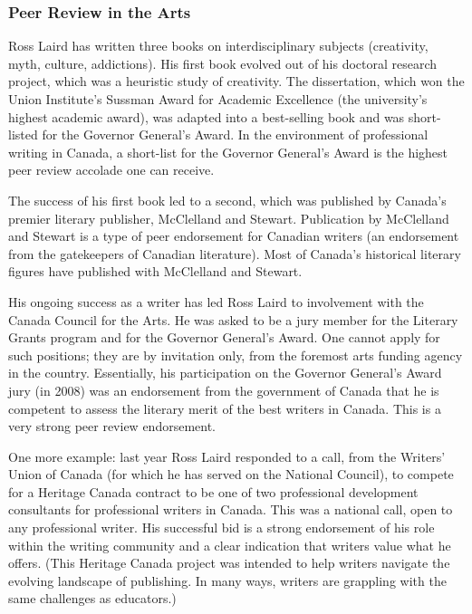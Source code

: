 \documentclass[letterpaper,10pt,headsepline]{scrreprt}
\begin{document}
\subsubsection{Peer Review in the Arts}

Ross Laird has written three books on interdisciplinary subjects (creativity,
myth, culture, addictions). His first book evolved out of his doctoral
research project, which was a heuristic study of creativity. The dissertation,
which won the Union Institute's Sussman Award for Academic Excellence (the
university's highest academic award), was adapted into a best-selling book and
was short-listed for the Governor General's Award. In the environment of
professional writing in Canada, a short-list for the Governor General's Award
is the highest peer review accolade one can receive.

The success of his first book led to a second, which was published by Canada's
premier literary publisher, McClelland and Stewart. Publication by McClelland
and Stewart is a type of peer endorsement for Canadian writers (an endorsement
from the gatekeepers of Canadian literature). Most of Canada's historical
literary figures have published with McClelland and Stewart.

His ongoing success as a writer has led Ross Laird to involvement with the
Canada Council for the Arts. He was asked to be a jury member for the Literary
Grants program and for the Governor General's Award. One cannot apply for such
positions; they are by invitation only, from the foremost arts funding agency
in the country. Essentially, his participation on the Governor General's Award
jury (in 2008) was an endorsement from the government of Canada that he is
competent to assess the literary merit of the best writers in Canada. This is
a very strong peer review endorsement.

One more example: last year Ross Laird responded to a call, from the Writers'
Union of Canada (for which he has served on the National Council), to compete
for a Heritage Canada contract to be one of two professional development
consultants for professional writers in Canada. This was a national call, open
to any professional writer. His successful bid is a strong endorsement of his
role within the writing community and a clear indication that writers value
what he offers. (This Heritage Canada project was intended to help writers
navigate the evolving landscape of publishing. In many ways, writers are
grappling with the same challenges as educators.)
\end{document}

